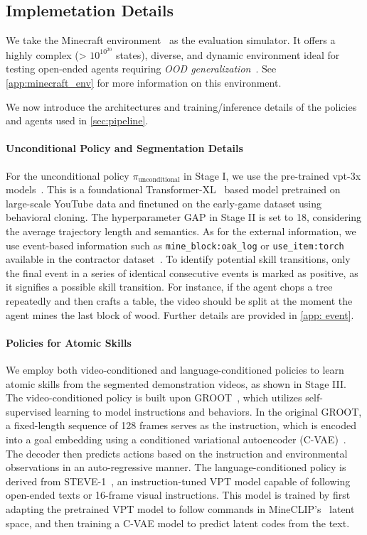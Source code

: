 \subsection{Implemetation Details}\label{sec:details}

We take the Minecraft environment~\citep{minerl,zheng2023towards} as the evaluation simulator. It offers a highly complex (> $10^{10^{20}}$ states), diverse, and dynamic environment ideal for testing open-ended agents requiring \textit{OOD generalization}~\citep{mcu}. See \cref{app:minecraft_env} for more information on this environment.

We now introduce the architectures and training/inference details of the policies and agents used in \cref{sec:pipeline}.

\paragraph{Unconditional Policy and Segmentation Details}
For the unconditional policy $\pi_\text{unconditional}$ in Stage I, we use the pre-trained vpt-3x models~\citep{vpt}. 
This is a foundational Transformer-XL~\citep{transformerxl} based model pretrained on large-scale YouTube data and finetuned on the early-game dataset using behavioral cloning.
The hyperparameter GAP in Stage II is set to 18, considering the average trajectory length and semantics. As for the external information, we use event-based information such as \texttt{mine\_block:oak\_log} or \texttt{use\_item:torch} available in the contractor dataset~\citep{vpt}. To identify potential skill transitions, only the final event in a series of identical consecutive events is marked as positive, as it signifies a possible skill transition. For instance, if the agent chops a tree repeatedly and then crafts a table, the video should be split at the moment the agent mines the last block of wood. Further details are provided in \cref{app: event}.

\paragraph{Policies for Atomic Skills}
We employ both video-conditioned and language-conditioned policies to learn atomic skills from the segmented demonstration videos, as shown in Stage III.
The video-conditioned policy is built upon GROOT~\citep{groot1}, which utilizes self-supervised learning to model instructions and behaviors. In the original GROOT, a fixed-length sequence of 128 frames serves as the instruction, which is encoded into a goal embedding using a conditioned variational autoencoder (C-VAE)~\citep{vae,cvae}. The decoder then predicts actions based on the instruction and environmental observations in an auto-regressive manner.
The language-conditioned policy is derived from STEVE-1~\citep{steve1}, an instruction-tuned VPT model capable of following open-ended texts or 16-frame visual instructions. This model is trained by first adapting the pretrained VPT model to follow commands in MineCLIP's~\citep{minedojo} latent space, and then training a C-VAE model to predict latent codes from the text. 

